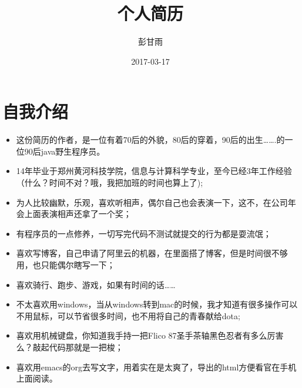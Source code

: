 \documentclass[11pt]{article}
\author{彭甘雨}
\date{2017-03-17}
\title{个人简历}
\begin{document}
\maketitle

\section*{自我介绍}
\label{sec:orgheadline1}
\begin{itemize}
\item 这份简历的作者，是一位有着70后的外貌，80后的穿着，90后的出生\ldots{}\ldots{}.的一位90后java野生程序员。
\item 14年毕业于郑州黄河科技学院，信息与计算科学专业，至今已经3年工作经验（什么？时间不对？哦，我把加班的时间也算上了);
\item 为人比较幽默，乐观，喜欢听相声，偶尔自己也会表演一下，这不，在公司年会上面表演相声还拿了一个奖；
\item 有程序员的一点修养，一切写完代码不测试就提交的行为都是耍流氓；
\item 喜欢写博客，自己申请了阿里云的机器，在里面搭了博客，但是时间很不够用，也只能偶尔瞎写一下；
\item 喜欢骑行、跑步、游戏，如果有时间的话\ldots{}\ldots{}
\item 不太喜欢用windows，当从windows转到mac的时候，我才知道有很多操作可以不用鼠标，可以节省很多时间，也不用将自己的青春献给dota;
\item 喜欢用机械键盘，你知道我手持一把Flico 87圣手茶轴黑色忍者有多么厉害么？敲起代码那就是一把梭；
\item 喜欢用emacs的org去写文字，用着实在是太爽了，导出的html方便看官在手机上面阅读。
\end{itemize}
\end{document}
